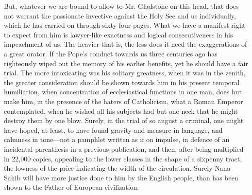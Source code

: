 But, whatever we are bound to allow to Mr. Gladstone on this head,
that does not warrant the passionate invective against the Holy See and
us individually, which he has carried on through sixty-four pages. What
we have a manifest right to expect from him is lawyer-like exactness and
logical consecutiveness in his impeachment of us. The heavier that is,
the less does it need the exaggerations of a great orator. If the Pope's
conduct towards us three centuries ago has righteously wiped out the
memory of his earlier benefits, yet he should have a fair trial. The
more intoxicating was his solitary greatness, when it was in the zenith,
the greater consideration should be shown towards him in his
present temporal humiliation, when concentration of ecclesiastical
functions in one man, does but make him, in the presence of the haters
of Catholicism, what a Roman Emperor contemplated, when he wished all
his subjects had but one neck that he might destroy them by one blow.
Surely, in the trial of so august a criminal, one might have hoped, at
least, to have found gravity and measure in language, and calmness in
tone—not a pamphlet written as if on impulse, in defence of an
incidental parenthesis in a previous publication, and then, after being
multiplied in 22,000 copies, appealing to the lower classes in the shape
of a sixpenny tract, the lowness of the price indicating the width of
the circulation. Surely Nana Sahib will have more justice done to him by
the English people, than has been shown to the Father of European
civilization.

